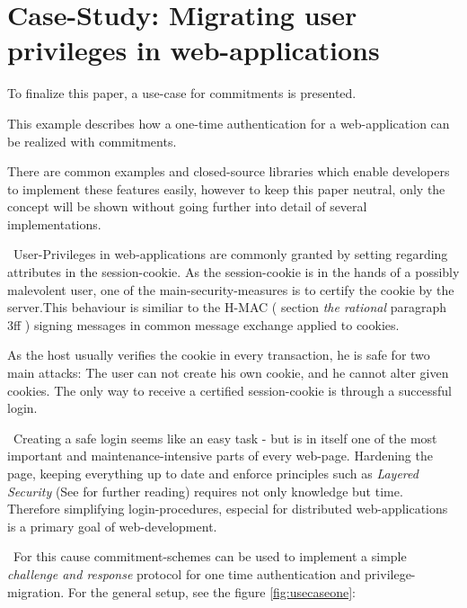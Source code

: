 
\section{Case-Study: Migrating user privileges in web-applications}
\label{sec:casestudy}
To finalize this paper, a use-case for commitments is presented. 

This example describes how a one-time authentication for a web-application can be realized with commitments. 

There are common examples and closed-source libraries which enable developers to implement these features easily, however to keep this paper neutral, only the concept will be shown without going further into detail of several implementations. 

~\newline User-Privileges in web-applications are commonly granted by setting regarding attributes in the session-cookie. As the session-cookie is in the hands of a possibly malevolent user, one of the main-security-measures is to certify the cookie by the server.This behaviour is similiar to the H-MAC (\cite{BeCaKra96} section \textit{the rational} paragraph 3ff ) signing messages in common message exchange applied to cookies. 

As the host usually verifies the cookie in every transaction, he is safe for two main attacks: The user can not create his own cookie, and he cannot alter given cookies. The only way to receive a certified session-cookie is through a successful login.

~\newline Creating a safe login seems like an easy task - but is in itself one of the most important and maintenance-intensive parts of every web-page. Hardening the page, keeping everything up to date and enforce principles such as \textit{Layered Security} (See \cite{Den12} for further reading) requires not only knowledge but time. Therefore simplifying login-procedures, especial for distributed web-applications is a primary goal of web-development. 

~\newline For this cause commitment-schemes can be used to implement a simple \textit{challenge and response} protocol for one time authentication and privilege-migration. For the general setup, see the figure \ref{fig:usecaseone}: 

